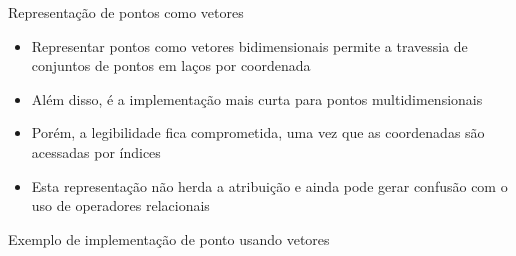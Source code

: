\begin{frame}[fragile]{Representação de pontos como vetores}

    \begin{itemize}
        \item Representar pontos como vetores bidimensionais permite a travessia de conjuntos
            de pontos em laços por coordenada
        \pause

        \item Além disso, é a implementação mais curta para pontos multidimensionais
        \pause

        \item Porém, a legibilidade fica comprometida, uma vez que as coordenadas são acessadas
            por índices
        \pause

        \item Esta representação não herda a atribuição e ainda pode gerar
            confusão com o uso de operadores relacionais
    \end{itemize}

\end{frame}

\begin{frame}[fragile]{Exemplo de implementação de ponto usando vetores}


\end{frame}
